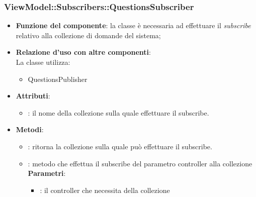 \subsubsection{ViewModel::Subscribers::QuestionsSubscriber}
\begin{itemize}
\item\textbf{Funzione del componente}: la classe è necessaria ad effettuare il \emph{subscribe} relativo alla collezione di domande del sistema;
	\item\textbf{Relazione d'uso con altre componenti}: \\
La classe utilizza:
	\begin{itemize}
		\item QuestionsPublisher	
	\end{itemize}
\item\textbf{Attributi}:
	\begin{itemize}
		\item{}: il nome della collezione sulla quale effettuare il subscribe.\\	
	\end{itemize}
\item\textbf{Metodi}:
	\begin{itemize}
		\item{}: ritorna la collezione sulla quale può effettuare il subscribe.\\
		\item{}: metodo che effettua il subscribe del parametro controller alla collezione\\
		\textbf{Parametri}:
			\begin{itemize}
				\item{}: il controller che necessita della collezione\\
			\end{itemize}
	\end{itemize}
\end{itemize}

